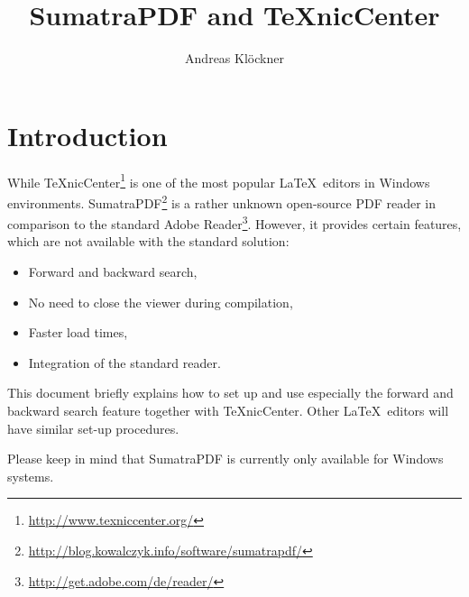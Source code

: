\documentclass{article}
\title{SumatraPDF and TeXnicCenter}
\author{Andreas Kl\"ockner}
\begin{document}
\maketitle

\section{Introduction}
While TeXnicCenter\footnote{\url{http://www.texniccenter.org/}} is one of the most popular \LaTeX\ editors in Windows environments. SumatraPDF\footnote{\url{http://blog.kowalczyk.info/software/sumatrapdf/}} is a rather unknown open-source PDF reader in comparison to the standard Adobe Reader\footnote{\url{http://get.adobe.com/de/reader/}}. However, it provides certain features, which are not available with the standard solution:
\begin{itemize}
	\item Forward and backward search,
	\item No need to close the viewer during compilation,
	\item Faster load times,
	\item Integration of the standard reader.
\end{itemize}

This document briefly explains how to set up and use especially the forward and backward search feature together with TeXnicCenter. Other \LaTeX\ editors will have similar set-up procedures. 

Please keep in mind that SumatraPDF is currently only available for Windows systems.
\end{document}
